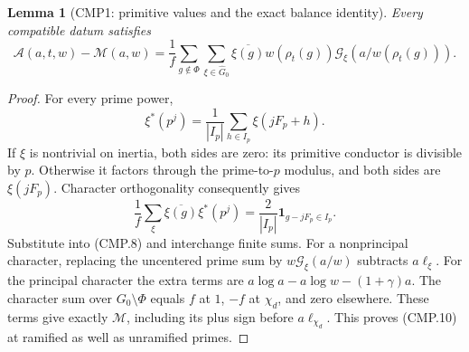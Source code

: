 \documentclass[11pt,a4paper]{article}
\numberwithin{equation}{section}
\newtheorem{lemma}[theorem]{Lemma}
\theoremstyle{remark}\newtheorem{remark}[theorem]{Remark}
\begin{document}
\begin{lemma}[CMP1: primitive values and the exact balance identity]
\label{claim:CMP1}
Every compatible datum satisfies
\[
 \mathcal A(a,\allowbreak{} t,\allowbreak{} w)-\mathcal M(a,\allowbreak{} w)
   =\frac1f\sum_{g\notin\Phi}\sum_{\xi\in\widehat G_0}
       \overline{\xi(g)}w(\rho_t(g))
                      \mathcal G_\xi(a/w(\rho_t(g))).
 \tag{CMP.10}
\]
\end{lemma}
\begin{proof}
For every prime power,
\[
 \xi^*(p^j)=\frac1{|I_p|}\sum_{h\in I_p}\xi(jF_p+h).
\]
If $\xi$ is nontrivial on inertia, both sides are zero: its
primitive conductor is divisible by $p$.  Otherwise it factors
through the prime-to-$p$ modulus, and both sides are $\xi(jF_p)$.
Character orthogonality consequently gives
\[
 \frac1f\sum_\xi\overline{\xi(g)}\xi^*(p^j)
          =\frac2{|I_p|}\mathbf1_{g-jF_p\in I_p}.
\]
Substitute into (CMP.8) and interchange finite sums.  For a
nonprincipal character, replacing the uncentered prime sum by
$w\mathcal G_\xi(a/w)$ subtracts $a\ell_\xi$.
For the principal character the extra terms are
$a\log a-a\log w-(1+\gamma)a$.
The character sum over $G_0\setminus\Phi$ equals $f$ at $1$,
$-f$ at $\chi_d$, and zero elsewhere.  These terms give exactly
$\mathcal M$, including its plus sign before $a\ell_{\chi_d}$.
This proves (CMP.10) at ramified as well as unramified primes.
\end{proof}
\end{document}

